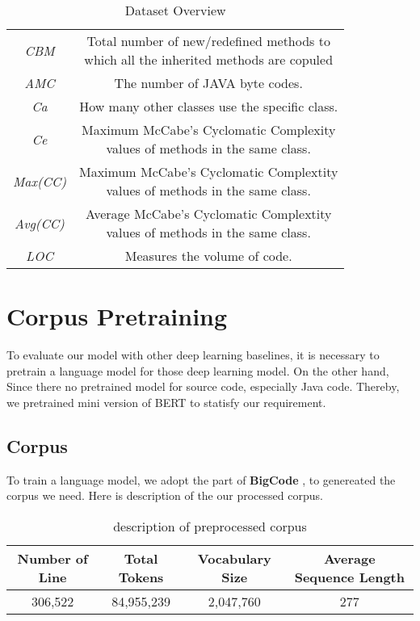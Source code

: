 \begin{table}[h]
\begin{tabular}{c|c}
        \textit{CBM} & \tabincell{c}{Total number of new/redefined methods to \\ which all the inherited methods are copuled} \\
        \textit{AMC} & The number of JAVA byte codes. \\
        \textit{Ca} & How many other classes use the specific class. \\
        \textit{Ce} & \tabincell{c}{Maximum McCabe's Cyclomatic Complexity \\ values of methods in the same class.} \\
        \textit{Max(CC)} & \tabincell{c}{Maximum McCabe's Cyclomatic Complextity \\ values of methods in the same class.} \\
        \textit{Avg(CC)} & \tabincell{c}{Average McCabe's Cyclomatic Complextity \\ values of methods in the same class.} \\
        \textit{LOC} & Measures the volume of code. \\
    \toprule[2pt]
    \end{tabular}
    \caption{Dataset Overview}
    \label{tab:my_label}
\end{table}

\section{Corpus Pretraining}
To evaluate our model with other deep learning baselines, it is necessary to pretrain a language model for those deep learning model. On the other hand, Since there no pretrained model for source code, especially Java code. Thereby, we pretrained mini version of BERT to statisfy our requirement. 

\subsection{Corpus}
To train a language model, we adopt the part of \textbf{BigCode} \cite{allamanis2018survey}, to genereated the corpus we need. Here is description of the our processed corpus.

\begin{table}[]
    \centering
    \begin{tabular}{c|c|c|c}
        \toprule[2pt]
        \textbf{Number of Line} & \textbf{Total Tokens} & \textbf{Vocabulary Size}  & \textbf{Average Sequence Length}\\
        \toprule[1pt]
        306,522 & 84,955,239 & 2,047,760 & 277 \\
        \toprule[2pt]
    \end{tabular}
    \caption{description of preprocessed corpus}
    \label{tab:my_label}
\end{table}

